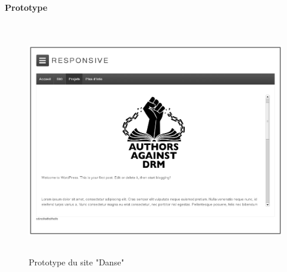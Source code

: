 \documentclass[11pt,a4paper]{report}
\begin{document}
			\paragraph*{Prototype}\subparagraph*{}
				\begin{figure}[H]
					\centering
					\includegraphics[height=10cm]{Prototype-Wordpress.eps}
					\caption{Prototype du site "Danse"}
					\label{fig:Prototype-Wordpress}
				\end{figure}
\end{document}
